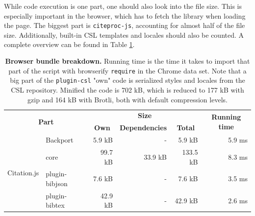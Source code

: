 \documentclass[fleqn,10pt,lineno]{wlpeerj} %
\begin{document}
While code execution is one part, one should also look into the file size. This is especially important in the browser, which has to fetch the library when loading the page. The biggest part is \texttt{citeproc-js}, accounting for almost half of the file size. Additionally, built-in CSL templates and locales should also be counted. A complete overview can be found in Table \ref{table:size}.

\begin{table}[bt!]
\caption{\textbf{Browser bundle breakdown.} Running time is the time it takes to import that part of the script with browserify \texttt{require} in the Chrome data set. Note that a big part of the \texttt{plugin-csl} "own" code is serialized styles and locales from the CSL repository. Minified the code is 702 kB, which is reduced to 177 kB with gzip and 164 kB with Brotli, both with default compression levels.}
\label{table:size}
\begin{tabular}{|l|l|r|r|r|r|}
\hline
\multicolumn{2}{|c|}{\multirow{2}{*}{\textbf{Part}}} & \multicolumn{3}{c|}{\textbf{Size}}                                                                                   & \multicolumn{1}{c|}{\multirow{2}{*}{\textbf{Running time}}} \\ \cline{3-5}
\multicolumn{2}{|c|}{}                               & \multicolumn{1}{c|}{\textbf{Own}} & \multicolumn{1}{c|}{\textbf{Dependencies}} & \multicolumn{1}{c|}{\textbf{Total}} & \multicolumn{1}{c|}{}                                       \\ \hline
\multirow{10}{*}{Citation.js}    & Backport          & 5.9 kB                            & -                                          & 5.9 kB                              & 5.9 ms                                                      \\ \cline{2-6} 
                                 & core              & 99.7 kB                           & 33.9 kB                                    & 133.5 kB                            & 8.3 ms                                                      \\ \cline{2-6} 
                                 & plugin-bibjson    & 7.6 kB                            & -                                          & 7.6 kB                              & 3.5 ms                                                      \\ \cline{2-6} 
                                 & plugin-bibtex     & 42.9 kB                           & -                                          & 42.9 kB                             & 2.6 ms                                                      \\ \cline{2-6} 

\end{tabular}
\end{table}
\end{document}
